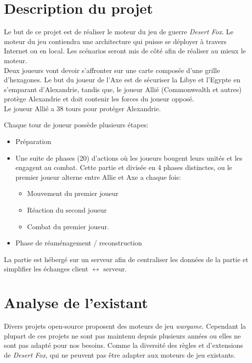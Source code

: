 \section{Description du projet}

Le but de ce projet est de réaliser le moteur du jeu de guerre \emph{Desert Fox}. Le moteur du jeu contiendra une architecture qui puisse se déployer à travers Internet ou en local. Les scénarios seront mis de côté afin de réaliser au mieux le moteur.\\

Deux joueurs vont devoir s'affronter sur une carte composée d'une grille d'hexagones. Le but du joueur de l'Axe est de sécuriser la Libye et l'Egypte en s'emparant d'Alexandrie, tandis que, le joueur Allié (Commonwealth et autres) protège Alexandrie et doit contenir les forces du joueur opposé.\\
Le joueur Allié a 38 tours pour protéger Alexandrie.

Chaque tour de joueur possède plusieurs étapes:
\begin{itemize}
    \item Préparation
    \item Une suite de phases (20) d'actions où les joueurs bougent leurs unités et les engagent au combat. Cette partie et divisée en 4 phases distinctes, ou le premier joueur alterne entre Allie et Axe a chaque fois:
    \begin{itemize}
        \item Mouvement du premier joueur
        \item Réaction du second joueur
        \item Combat du premier joueur.
    \end{itemize}
    \item Phase de réaménagement / reconstruction
\end{itemize}


La partie est hébergé sur un serveur afin de centraliser les données de la partie et simplifier les échanges client $\leftrightarrow$ serveur.

\section{Analyse de l'existant}

Divers projets open-source proposent des moteurs de jeu \emph{wargame}. Cependant la plupart de ces projets ne sont pas maintenu depuis plusieurs années ou elles ne sont pas adapté pour nos besoins. Comme la diversité des règles et d'extensions de \emph{Desert Fox}, qui ne peuvent pas être adapter aux moteurs de jeu existants.

